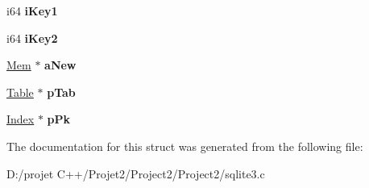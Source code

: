 \begin{DoxyCompactItemize}
i64 {\bfseries i\+Key1}
\item 
\mbox{\label{struct_pre_update_adeecdda5c18124870ad08b70832f7387}} 
i64 {\bfseries i\+Key2}
\item 
\mbox{\label{struct_pre_update_a3d8862bac16113aeb528b1aeafe4f118}} 
\mbox{\hyperlink{structsqlite3__value}{Mem}} $\ast$ {\bfseries a\+New}
\item 
\mbox{\label{struct_pre_update_a6e7848e9ef889f2dc47f68a5a2a0ed4a}} 
\mbox{\hyperlink{struct_table}{Table}} $\ast$ {\bfseries p\+Tab}
\item 
\mbox{\label{struct_pre_update_a7258663d158a1c21b62f30c9de685482}} 
\mbox{\hyperlink{struct_index}{Index}} $\ast$ {\bfseries p\+Pk}
\end{DoxyCompactItemize}


The documentation for this struct was generated from the following file\+:\begin{DoxyCompactItemize}
\item 
D\+:/projet C++/\+Projet2/\+Project2/\+Project2/sqlite3.\+c\end{DoxyCompactItemize}
